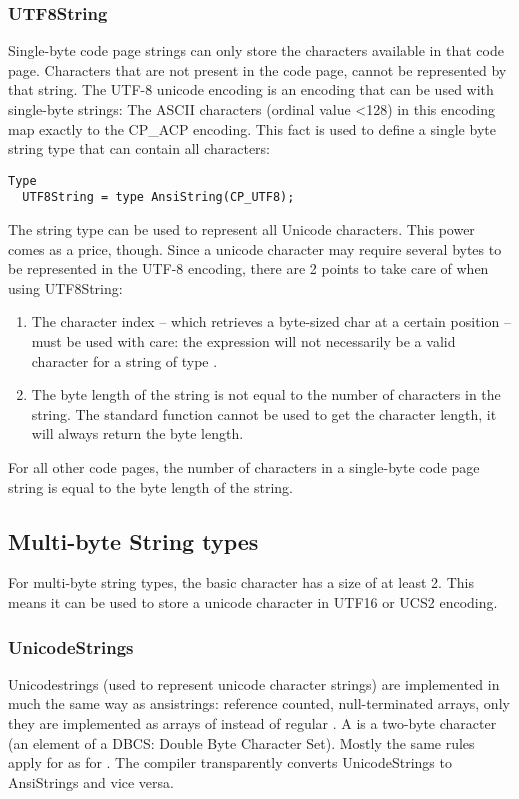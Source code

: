 \subsubsection{UTF8String}
Single-byte code page strings can only store the characters available in that code page.  
Characters that are not present in the code page, cannot be represented by that string.
The UTF-8 unicode encoding is an encoding that can be used with single-byte strings: 
The ASCII characters (ordinal value <128) in this encoding map exactly to the CP_ACP encoding. 
This fact is used to define a single byte string type that can contain all characters:
\begin{verbatim}
Type
  UTF8String = type AnsiString(CP_UTF8);
\end{verbatim}
The  string type can be used to represent all Unicode characters. This power comes as a price, though. 
Since a unicode character may require several bytes to be represented in the UTF-8 encoding, there are 2 points to take 
care of when using UTF8String:
\begin{enumerate}
\item The character index -- which retrieves a byte-sized char at a certain position -- must be used with care: the expression 
 will not necessarily be a valid character for a string  of type .
\item The byte length of the string is not equal to the number of characters in the string. 
The standard function  cannot be used to get the character length, it will always return the byte length.
\end{enumerate}
For all other code pages, the number of characters in a single-byte code page string is equal to the byte length of the string.


\subsection{Multi-byte String types}
For multi-byte string types, the basic character has a size of at least 2. 
This means it can be used to store a unicode character in UTF16 or UCS2 encoding.

\subsubsection{UnicodeStrings}
Unicodestrings (used to represent unicode character strings) are implemented in much 
the same way as ansistrings: reference counted, null-terminated arrays, only they 
are implemented as arrays of  instead of regular .
A  is a two-byte character (an element of a DBCS: Double Byte
Character Set). Mostly the same rules apply for  as for
. The compiler transparently converts UnicodeStrings to
AnsiStrings and vice versa. 


